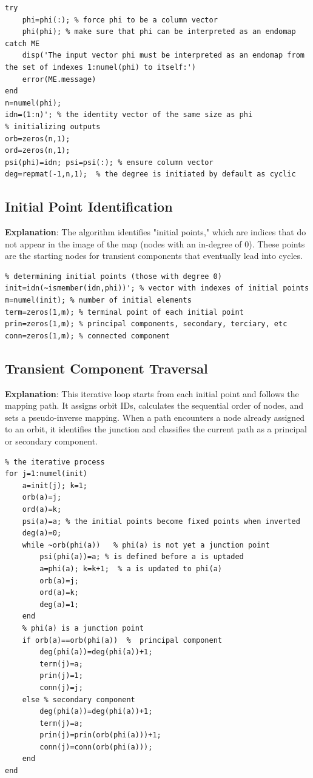\begin{lstlisting}
try
    phi=phi(:); % force phi to be a column vector
    phi(phi); % make sure that phi can be interpreted as an endomap
catch ME
    disp('The input vector phi must be interpreted as an endomap from the set of indexes 1:numel(phi) to itself:')
    error(ME.message)
end
n=numel(phi);
idn=(1:n)'; % the identity vector of the same size as phi
% initializing outputs
orb=zeros(n,1);
ord=zeros(n,1);
psi(phi)=idn; psi=psi(:); % ensure column vector
deg=repmat(-1,n,1);  % the degree is initiated by default as cyclic
\end{lstlisting}

\subsection{Initial Point Identification}
\textbf{Explanation}: The algorithm identifies "initial points," which are indices that do not appear in the image of the map (nodes with an in-degree of 0). These points are the starting nodes for transient components that eventually lead into cycles.

\begin{lstlisting}
% determining initial points (those with degree 0)
init=idn(~ismember(idn,phi))'; % vector with indexes of initial points
m=numel(init); % number of initial elements
term=zeros(1,m); % terminal point of each initial point
prin=zeros(1,m); % principal components, secondary, terciary, etc
conn=zeros(1,m); % connected component
\end{lstlisting}

\subsection{Transient Component Traversal}
\textbf{Explanation}: This iterative loop starts from each initial point and follows the mapping path. It assigns orbit IDs, calculates the sequential order of nodes, and sets a pseudo-inverse mapping. When a path encounters a node already assigned to an orbit, it identifies the junction and classifies the current path as a principal or secondary component.

\begin{lstlisting}
% the iterative process
for j=1:numel(init)
    a=init(j); k=1;
    orb(a)=j;
    ord(a)=k;
    psi(a)=a; % the initial points become fixed points when inverted
    deg(a)=0;
    while ~orb(phi(a))   % phi(a) is not yet a junction point
        psi(phi(a))=a; % is defined before a is uptaded
        a=phi(a); k=k+1;  % a is updated to phi(a)
        orb(a)=j;
        ord(a)=k;
        deg(a)=1;
    end
    % phi(a) is a junction point
    if orb(a)==orb(phi(a))  %  principal component
        deg(phi(a))=deg(phi(a))+1;
        term(j)=a;
        prin(j)=1;
        conn(j)=j;  
    else % secondary component
        deg(phi(a))=deg(phi(a))+1;
        term(j)=a; 
        prin(j)=prin(orb(phi(a)))+1;
        conn(j)=conn(orb(phi(a)));
    end
end
\end{lstlisting}

